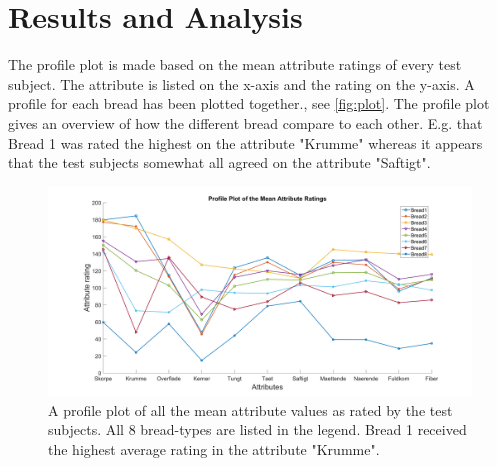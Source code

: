 \section*{Results and Analysis}
\label{Results}
%




The profile plot is made based on the mean attribute ratings of every test subject. The attribute is listed on the x-axis and the rating on the y-axis. A profile for each bread has been plotted together., see \autoref{fig:plot}. The profile plot gives an overview of how the different bread compare to each other. E.g. that Bread 1 was rated the highest on the attribute "Krumme" whereas it appears that the test subjects somewhat all agreed on the attribute "Saftigt".

\begin{figure}
\centering
\includegraphics[width=\textwidth]{Figure/profile_plot.png}
\caption{A profile plot of all the mean attribute values as rated by the test subjects. All 8 bread-types are listed in the legend. Bread 1 received the highest average rating in the attribute "Krumme".}
\end{figure}

\noindent


